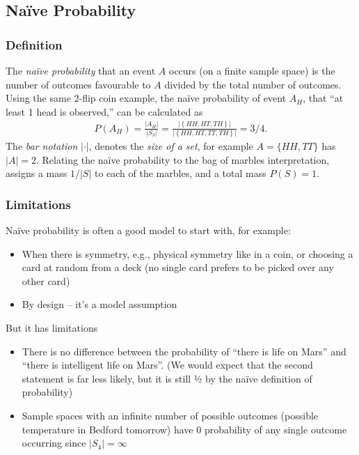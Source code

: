\subsection{Naïve Probability}

\subsubsection{Definition}

The \emph{naïve probability} that an event \(A\) 
occurs (on a finite sample space) is 
the number of outcomes favourable to \(A\) divided by the total number of outcomes. 
Using the same 2-flip coin example, 
the naïve probability of event \(A_{H}\), 
that ``at least 1 head is observed,''
can be calculated as
\begin{align}
P\left( A_{H} \right) = \frac{\left| A_{H} \right|}{\left| S_{3} \right|} = 
\frac{\left| \left\{ HH, HT,TH \right\} \right|}{|\left\{ HH,HT,TT,TH \right\}|} = 3/4.
\end{align}
The \emph{bar notation} \(|\cdot|\), 
denotes the \emph{size of a set}, 
for example \(A = \{HH, TT\}\) 
has \(|A| = 2\).
Relating the naïve probability to the bag of marbles interpretation,
assigns a mass \(1/|S|\) to each of the marbles, 
and a total mass \(P(S) = 1\).

\subsubsection{Limitations}

Naïve probability is often a good model to start with, for example:

\begin{itemize}
\item
When there is symmetry, e.g., physical symmetry like in a coin, 
or choosing a card at random from a deck 
(no single card prefers to be picked over any other card)
\item
By design -- it's a model assumption
\end{itemize}

But it has limitations

\begin{itemize}
\item
There is no difference between the probability of ``there is life on Mars'' 
and ``there is intelligent life on Mars''. 
(We would expect that the second statement is far less likely, 
but it is still ½ by the naïve definition of probability)
\item
Sample spaces with an infinite number of possible 
outcomes (possible temperature in Bedford tomorrow) have 0 probability of any single
outcome occurring since \(\left| S_{4} \right| = \infty\)
\end{itemize}

